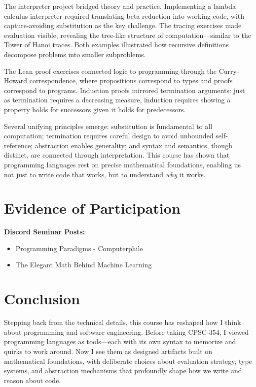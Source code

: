 \documentclass{article}
\theoremstyle{theorem}
\theoremstyle{definition}
\theoremstyle{remark}
\begin{document}
The interpreter project bridged theory and practice. Implementing a lambda calculus interpreter required translating beta-reduction into working code, with capture-avoiding substitution as the key challenge. The tracing exercises made evaluation visible, revealing the tree-like structure of computation---similar to the Tower of Hanoi traces. Both examples illustrated how recursive definitions decompose problems into smaller subproblems.

The Lean proof exercises connected logic to programming through the Curry-Howard correspondence, where propositions correspond to types and proofs correspond to programs. Induction proofs mirrored termination arguments: just as termination requires a decreasing measure, induction requires showing a property holds for successors given it holds for predecessors.

Several unifying principles emerge: substitution is fundamental to all computation; termination requires careful design to avoid unbounded self-reference; abstraction enables generality; and syntax and semantics, though distinct, are connected through interpretation. This course has shown that programming languages rest on precise mathematical foundations, enabling us not just to write code that works, but to understand \emph{why} it works.

\section{Evidence of Participation}

\textbf{Discord Seminar Posts:}
\begin{itemize}
\item Programming Paradigms - Computerphile
\item The Elegant Math Behind Machine Learning
\end{itemize}

\section{Conclusion}\label{conclusion}

Stepping back from the technical details, this course has reshaped how I think about programming and software engineering. Before taking CPSC-354, I viewed programming languages as tools---each with its own syntax to memorize and quirks to work around. Now I see them as designed artifacts built on mathematical foundations, with deliberate choices about evaluation strategy, type systems, and abstraction mechanisms that profoundly shape how we write and reason about code.
\end{document}
